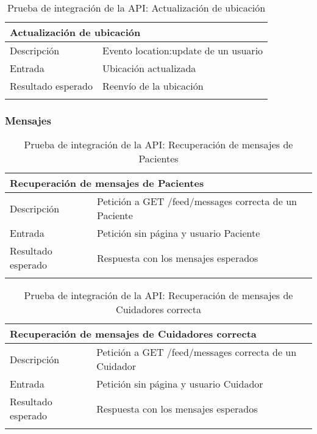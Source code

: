 \begin{longtable}{|p{} p{}|}
    \hline
    \multicolumn{2}{|l|}{\textbf{Actualización de ubicación}} \\ \hline 
    Descripción                 & Evento location:update de un usuario \\ \hline
    Entrada                     & Ubicación actualizada \\ \hline
    Resultado esperado          & Reenvío de la ubicación \\ \hline
    \caption{Prueba de integración de la API: Actualización de ubicación}
    \label{cp:i:api:actualizacion_ubicacion}
\end{longtable}

\vspace{-15pt}
\subsubsection{Mensajes}

\begin{longtable}{|p{} p{}|}
    \hline
    \multicolumn{2}{|l|}{\textbf{Recuperación de mensajes de Pacientes}} \\ \hline 
    Descripción                 & Petición a GET /feed/messages correcta de un Paciente \\ \hline
    Entrada                     & Petición sin página y usuario Paciente \\ \hline
    Resultado esperado          & Respuesta con los mensajes esperados \\ \hline
    \caption{Prueba de integración de la API: Recuperación de mensajes de Pacientes}
    \label{cp:i:api:recuperacion_mensajes_pacientes}
\end{longtable}

\vspace{-10pt}
\begin{longtable}{|p{} p{}|}
    \hline
    \multicolumn{2}{|l|}{\textbf{Recuperación de mensajes de Cuidadores correcta}} \\ \hline 
    Descripción                 & Petición a GET /feed/messages correcta de un Cuidador \\ \hline
    Entrada                     & Petición sin página y usuario Cuidador \\ \hline
    Resultado esperado          & Respuesta con los mensajes esperados \\ \hline
    \caption{Prueba de integración de la API: Recuperación de mensajes de Cuidadores correcta}
    \label{cp:i:api:recuperacion_mensajes_cuidadores}
\end{longtable}

